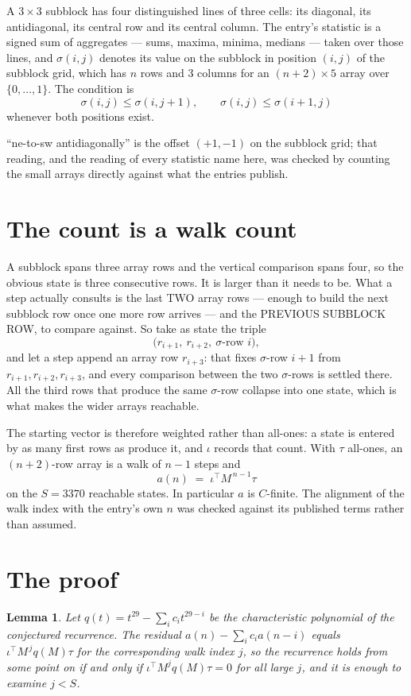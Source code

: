 \documentclass[11pt,a4paper]{article}
\theoremstyle{plain}
\newtheorem{lemma}[theorem]{Lemma}
\theoremstyle{definition}
\begin{document}
A $3\times3$ subblock has four distinguished lines of three cells: its diagonal, its
antidiagonal, its central row and its central column. The entry's statistic is a signed sum of
aggregates --- sums, maxima, minima, medians --- taken over those lines, and $\sigma(i,j)$
denotes its value on the subblock in position $(i,j)$ of the subblock grid, which has $n$ rows
and $3$ columns for an $(n+2)\times5$ array over $\{0,\dots,1\}$. The condition is
\[
\sigma(i,j)\le\sigma(i,j+1),\qquad \sigma(i,j)\le\sigma(i+1,j)
\]
whenever both positions exist.

``ne-to-sw antidiagonally'' is the offset $(+1,-1)$ on the subblock grid; that reading, and
the reading of every statistic name here, was checked by counting the small arrays directly
against what the entries publish.

\section{The count is a walk count}

A subblock spans three array rows and the vertical comparison spans four, so the obvious state
is three consecutive rows. It is larger than it needs to be. What a step actually consults is
the last TWO array rows --- enough to build the next subblock row once one more row arrives ---
and the PREVIOUS SUBBLOCK ROW, to compare against. So take as state the triple
\[
\bigl(r_{i+1},\ r_{i+2},\ \sigma\text{-row }i\bigr),
\]
and let a step append an array row $r_{i+3}$: that fixes $\sigma$-row $i+1$ from
$r_{i+1},r_{i+2},r_{i+3}$, and every comparison between the two $\sigma$-rows is settled
there. All the third rows that produce the same $\sigma$-row collapse into one state, which is
what makes the wider arrays reachable.

The starting vector is therefore weighted rather than all-ones: a state is entered by as many
first rows as produce it, and $\iota$ records that count. With $\tau$ all-ones, an
$(n+2)$-row array is a walk of $n-1$ steps and
\[
a(n)\;=\;\iota^{\!\top}M^{\,n-1}\tau
\]
on the $S=3370$ reachable states. In particular $a$ is $C$-finite. The alignment of the walk
index with the entry's own $n$ was checked against its published terms rather than assumed.

\section{The proof}

\begin{lemma}\label{lem:crit}
Let $q(t)=t^{29}-\sum_i c_it^{29-i}$ be the characteristic polynomial of the
conjectured recurrence. The residual $a(n)-\sum_ic_ia(n-i)$ equals
$\iota^{\!\top}M^{\,j}q(M)\tau$ for the corresponding walk index $j$, so the recurrence
holds from some point on if and only if $\iota^{\!\top}M^{j}q(M)\tau=0$ for all large $j$,
and it is enough to examine $j<S$.
\end{lemma}
\end{document}
